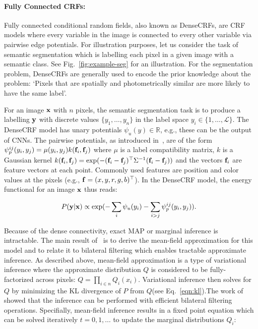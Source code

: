 \paragraph{Fully Connected CRFs:} Fully connected conditional random fields,
also known as DenseCRFs, are CRF models where every variable in the image is connected to
every other variable via pairwise edge potentials. For illustration purposes,
let us consider the task of semantic segmentation which is labelling each pixel
in a given image with a semantic class. See Fig.~\ref{fig:example-seg} for an
illustration. For the segmentation problem, DenseCRFs
are generally used to encode the prior knowledge about the problem:
`Pixels that are spatially and photometrically similar are more likely to have the same label'.

For an image $\mathbf{x}$ with $n$ pixels, the semantic segmentation task is to produce a
labelling $\mathbf{y}$ with discrete values
$\{y_1,\dots,y_n\}$ in the label space $y_i\in\{1,\ldots,\mathcal{L}\}$. The DenseCRF model has
unary potentials $\psi_u(y)\in\mathbb{R}$, e.g., these can be the output of CNNs.
The pairwise potentials, as introduced in~\cite{krahenbuhl2012efficient},
are of the form $\psi^{ij}_p(y_i,y_j) = \mu(y_i,y_j) k(\mathbf{f}_i,\mathbf{f}_j)$
where $\mu$ is a label compatibility matrix, $k$ is a Gaussian kernel
$k(\mathbf{f}_i,\mathbf{f}_j)=\exp(-(\mathbf{f}_i-\mathbf{f}_j)^{\top}\Sigma^{-1}(\mathbf{f}_i-\mathbf{f}_j))$ and
the vectors $\mathbf{f}_i$ are feature vectors at each point. Commonly used features are
position and color values at the pixels (e.g., $\mathbf{f}=(x,y,r,g,b)^\top$).
In the DenseCRF model, the energy functional for an image $\mathbf{x}$ thus reads:

\begin{equation}
P(\mathbf{y}|\mathbf{x})\propto\exp(-\sum_i\psi_u(y_i)-\sum_{i>j}\psi^{ij}_p(y_i,y_j)).
\end{equation}

Because of the dense connectivity, exact MAP or marginal inference is intractable. The main result
of~\cite{krahenbuhl2012efficient} is to derive the mean-field approximation for this model and to relate it
to bilateral filtering which enables tractable approximate inference.
As described above, mean-field approximation is a type of variational inference
where the approximate distribution $Q$ is considered to be fully-factorized
across pixels:
$Q=\prod_{i \in n} Q_i(x_i)$. Variational inference then solves for $Q$ by minimizing
the KL divergence of $P$ from $Q$(see Eq.~\ref{eqn:kl}).The work of~\cite{krahenbuhl2012efficient}
showed that the inference can be performed with efficient bilateral filtering
~\cite{aurich1995non, smith97ijcv, tomasi1998bilateral, adams2010fast} operations.
Specifially, mean-field inference results in a fixed point equation which
can be solved iteratively $t=0,1,\ldots$ to update the marginal distributions $Q_i$:


